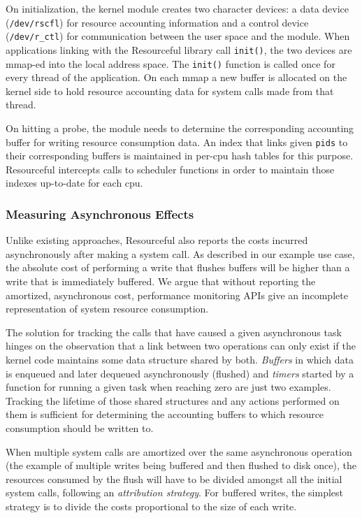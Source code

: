 \documentclass[letterpaper,twocolumn,10pt]{article}
\newcommand{\pname}{Resourceful}
\begin{document}
On initialization, the kernel module creates two character devices: a data
device (\texttt{/dev/rscfl}) for resource accounting information and a control
device (\texttt{/dev/r\_ctl}) for communication between the user space and the
module. When applications linking with the \pname{ }library call
\texttt{init()}, the two devices are mmap-ed into the local address space. The
\texttt{init()} function is called once for every thread of the application. On
each mmap a new buffer is allocated on the kernel side to hold resource
accounting data for system calls made from that thread.

On hitting a probe, the module needs to determine the corresponding accounting
buffer for writing resource consumption data. An index that links given \texttt{pids} to
their corresponding buffers is maintained in per-cpu hash tables for this
purpose. \pname{ } intercepts calls to scheduler functions in order to maintain
those indexes up-to-date for each cpu.

\subsubsection{Measuring Asynchronous Effects}
Unlike existing approaches, \pname{} also reports the costs incurred
asynchronously after making a system call. As described in our example
use case, the absolute cost of performing a write that flushes buffers will be
higher than a write that is immediately buffered. We argue that without
reporting the amortized, asynchronous cost, performance monitoring APIs give an
incomplete representation of system resource consumption.

The solution for tracking the calls that have caused a given asynchronous task
hinges on the observation that a link between two operations can only exist if
the kernel code maintains some data structure shared by both. \textit{Buffers}
in which data is enqueued and later dequeued asynchronously (flushed) and
\textit{timers} started by a function for running a given task when reaching
zero are just two examples. Tracking the lifetime of those shared structures and
any actions performed on them is sufficient for determining the accounting
buffers to which resource consumption should be written to. 

When multiple system calls are amortized over the same asynchronous operation
(the example of multiple writes being buffered and then flushed to disk once),
the resources consumed by the flush will have to be divided amongst all the
initial system calls, following an \textit{attribution strategy}. For buffered writes,
the simplest strategy is to divide the costs proportional to the size of each
write.
\end{document}
